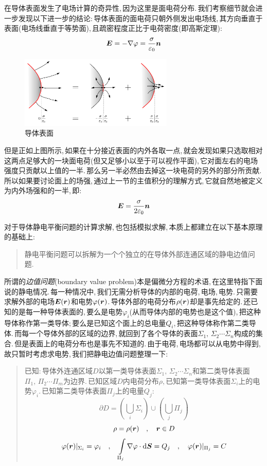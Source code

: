 在导体表面发生了电场计算的奇异性,\,因为这里是面电荷分布.\,我们考察细节就会进一步发现以下进一步的结论:\,导体表面的面电荷只朝外侧发出电场线,\,其方向垂直于表面(电场线垂直于等势面),\,且疏密程度正比于电荷密度(即高斯定理):
\[\boldsymbol{E}=-\nabla\varphi=\frac{\sigma}{\varepsilon_0}\boldsymbol{n}\]

\begin{figure}[H]
\centering
\includegraphics[width=0.65\textwidth]{image/7-2-3.png}
\caption{导体表面}
\end{figure}

但是正如上图所示,\,如果在十分接近表面的内外各取一点,\,就会发现如果只选取相对这两点足够大的一块面电荷(但又足够小以至于可以视作平面),\,它对面左右的电场强度只贡献以上值的一半.\,那么另一半必然由去掉这一块电荷的另外的部分所贡献.\,所以如果要讨论面上的场强,\,通过上一节的主值积分的理解方式,\,它就自然地被定义为内外场强和的一半,\,即:
\[\boldsymbol{E}=\frac{\sigma}{2\varepsilon_0}\boldsymbol{n}\]

对于导体静电平衡问题的计算求解,\,也包括模拟求解,\,本质上都建立在以下基本原理的基础上:

\begin{verse}
静电平衡问题可以拆解为一个个独立的在导体外部连通区域的静电边值问题.
\end{verse}

所谓的\emph{边值问题}(boundary value problem)本是偏微分方程的术语,\,在这里特指下面说的静电情况.\,每一种情况中,\,我们无需分析导体的内部的电荷,\,电场,\,电势.\,只需要求解外部的电场$\boldsymbol{E}(\boldsymbol{r})$和电势$\varphi(\boldsymbol{r})$.\,导体外部的电荷分布$\rho(\boldsymbol{r})$却是事先给定的.\,还已知的是每一种导体表面的,\,要么是电势$\varphi_i$(从而导体内部的电势也是这个值),\,把这种导体称作第一类导体;\,要么是已知这个面上的总电量$Q_i$,\,把这种导体称作第二类导体.\,而每一个导体外部的区域的边界,\,就回到了各个导体的表面$\Sigma_1,\,\Sigma_2\cdots\Sigma_n$构成的集合.\,但是表面上的电荷分布也是事先不知道的.\,由于电荷,\,电场都可以从电势中得到,\,故只暂时考虑求电势,\,我们把静电边值问题整理一下:

\begin{verse}
已知:\,导体外连通区域$D$以第一类导体表面$\Sigma_1,\,\Sigma_2\cdots\Sigma_n$和第二类导体表面$\Pi_1,\,\Pi_2\cdots\Pi_m$为边界.\,已知区域$D$内电荷分布$\rho$,\,已知第一类导体表面$\Sigma_i$上的电势$\varphi_i$.\,已知第二类导体表面$\Pi_j$上的电量$Q_j$:
\[\partial D=\left(\bigcup_i \Sigma_i\right)\cup \left(\bigcup_j\Pi_j  \right) \]
\[\rho=\rho(\boldsymbol{r}) \quad,\quad \boldsymbol{r}\in D\]
\[\varphi(\boldsymbol{r})|_{\Sigma_i}=\varphi_i \quad, \quad \int\limits_{\Pi_j}\nabla\varphi\cdot \textrm{d} \boldsymbol{S}=Q_j \quad, \quad \varphi(\boldsymbol{r})|_{\Pi_j}=C\]


\end{verse}

